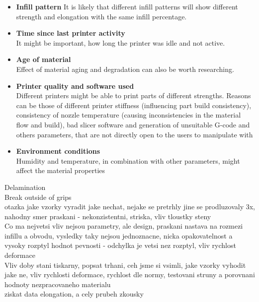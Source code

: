 \documentclass[a4paper, twoside, 11pt]{report}
\begin{document}
\begin{itemize}%
\item \textbf{Infill pattern}
	It is likely that different infill patterns will show different strength and elongation with the same infill percentage.
\item \textbf{Time since last printer activity}\\
	It might be important, how long the printer was idle and not active.
\item \textbf{Age of material}\\
	Effect of material aging and degradation can also be worth researching.
\item \textbf{Printer quality and software used}\\
	Different printers might be able to print parts of different strengths. Reasons can be those of different printer stiffness (influencing part build consistency), consistency of nozzle temperature (causing inconsistencies in the material flow and build), bad slicer software and generation of unsuitable G-code and others parameters, that are not directly open to the users to manipulate with
\item \textbf{Environment conditions}\\
	Humidity and temperature, in combination with other parameters, might affect the material properties
\end{itemize}
Delamination\\
Break outside of grips\\
otazka jake vzorky vyradit jake nechat, nejake se pretrhly jine se prodluzovaly 3x, nahodny smer praskani - nekonzistentni, striska, vliv tloustky steny
\\Co ma nejvetsi vliv nejsou parametry, ale design, praskani nastava na rozmezi infillu a obvodu, vysledky taky nejsou jednoznacne, nicka opakovatelnost a vysoky rozptyl hodnot pevnosti - odchylka je vetsi nez rozptyl, vliv rychlost deformace
\\Vliv doby stani tiskarny, popsat trhani, ceh jsme si vsimli, jake vzorky vyhodit jake ne, vliv rychlosti deformace, rychlost dle normy, testovani struny a porovnani hodnoty nezpracovaneho materialu
\\ziskat data elongation, a cely prubeh zkousky

\tableofcontents
\listoftodos
\end{document}
